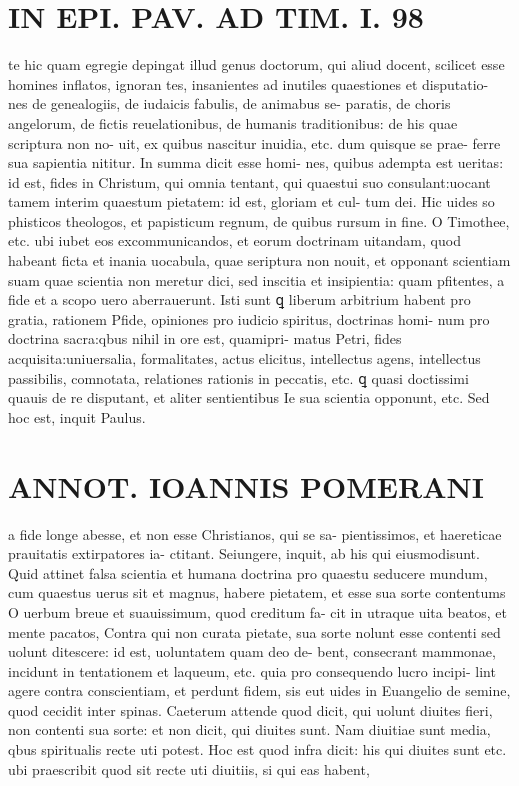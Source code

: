\documentclass{article}
\begin{document}
\begin{pages}
\section*{IN EPI. PAV. AD TIM. I. 98 }
\marginpar{[ p.98 ]}\pstart te hic quam egregie depingat illud genus doctorum, qui aliud docent, scilicet esse homines inflatos, ignoran tes, insanientes ad inutiles quaestiones et disputatio- nes de genealogiis, de iudaicis fabulis, de animabus se- paratis, de choris angelorum, de fictis reuelationibus, de humanis traditionibus: de his quae scriptura non no- uit, ex quibus nascitur inuidia, etc. dum quisque se prae- ferre sua sapientia nititur. In summa dicit esse homi- nes, quibus adempta est ueritas: id est, fides in Christum, qui omnia tentant, qui quaestui suo consulant:uocant tamem interim quaestum pietatem: id est, gloriam et cul- tum dei. Hic uides so phisticos theologos, et papisticum regnum, de quibus rursum in fine. O Timothee, etc. ubi iubet eos excommunicandos, et eorum doctrinam uitandam, quod habeant ficta et inania uocabula, quae seriptura non nouit, et opponant scientiam suam quae scientia non meretur dici, sed inscitia et insipientia: quam pfitentes, a fide et a scopo uero aberrauerunt. Isti sunt ꝗ liberum arbitrium habent pro gratia, rationem Pfide, opiniones pro iudicio spiritus, doctrinas homi- num pro doctrina sacra:qbus nihil in ore est, quamipri- matus Petri, fides acquisita:uniuersalia, formalitates, actus elicitus, intellectus agens, intellectus passibilis, comnotata, relationes rationis in peccatis, etc. ꝗ quasi doctissimi quauis de re disputant, et aliter sentientibus Ie sua scientia opponunt, etc. Sed hoc est, inquit Paulus.  \pend
\section*{ANNOT. IOANNIS POMERANI }\pstart a fide longe abesse, et non esse Christianos, qui se sa- pientissimos, et haereticae prauitatis extirpatores ia- ctitant. Seiungere, inquit, ab his qui eiusmodisunt.  \pend\pstart Quid attinet falsa scientia et humana doctrina pro quaestu seducere mundum, cum quaestus uerus sit et magnus, habere pietatem, et esse sua sorte contentums O uerbum breue et suauissimum, quod creditum fa- cit in utraque uita beatos, et mente pacatos, Contra qui non curata pietate, sua sorte nolunt esse contenti sed uolunt ditescere: id est, uoluntatem quam deo de- bent, consecrant mammonae, incidunt in tentationem et laqueum, etc. quia pro consequendo lucro incipi- lint agere contra conscientiam, et perdunt fidem, sis eut uides in Euangelio de semine, quod cecidit inter spinas. Caeterum attende quod dicit, qui uolunt diuites fieri, non contenti sua sorte: et non dicit, qui diuites sunt. Nam diuitiae sunt media, qbus spiritualis recte uti potest. Hoc est quod infra dicit: his qui diuites sunt etc. ubi praescribit quod sit recte uti diuitiis, si qui eas habent,  \pend
{}
{}

\end{pages}
\end{document}
